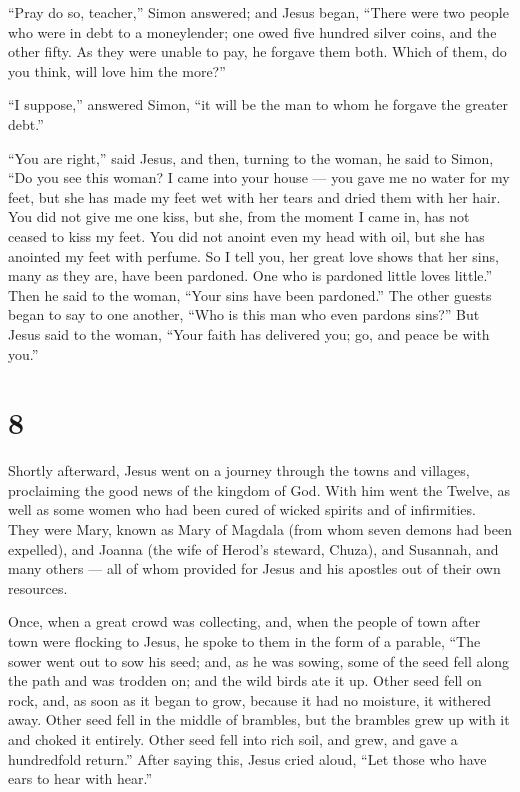 ``Pray do so, teacher,'' Simon answered; and Jesus began, 
``There were two people who were in debt to a moneylender; one owed five
hundred silver coins, and the other fifty.  As they were
unable to pay, he forgave them both. Which of them, do you think, will
love him the more?''

 ``I suppose,'' answered Simon, ``it will be the man to
whom he forgave the greater debt.''

``You are right,'' said Jesus,  and then, turning to the
woman, he said to Simon, ``Do you see this woman? I came into your house
--- you gave me no water for my feet, but she has made my feet wet with
her tears and dried them with her hair.  You did not give
me one kiss, but she, from the moment I came in, has not ceased to kiss
my feet.  You did not anoint even my head with oil, but she
has anointed my feet with perfume.  So I tell you, her
great love shows that her sins, many as they are, have been pardoned.
One who is pardoned little loves little.''  Then he said to
the woman, ``Your sins have been pardoned.''  The other
guests began to say to one another, ``Who is this man who even pardons
sins?''  But Jesus said to the woman, ``Your faith has
delivered you; go, and peace be with you.''

\hypertarget{section-6}{%
\section{8}\label{section-6}}

 Shortly afterward, Jesus went on a journey through the
towns and villages, proclaiming the good news of the kingdom of God.
With him went the Twelve,  as well as some women who had
been cured of wicked spirits and of infirmities. They were Mary, known
as Mary of Magdala (from whom seven demons had been expelled),
 and Joanna (the wife of Herod's steward, Chuza), and
Susannah, and many others --- all of whom provided for Jesus and his
apostles out of their own resources.

 Once, when a great crowd was collecting, and, when the
people of town after town were flocking to Jesus, he spoke to them in
the form of a parable,  ``The sower went out to sow his
seed; and, as he was sowing, some of the seed fell along the path and
was trodden on; and the wild birds ate it up.  Other seed
fell on rock, and, as soon as it began to grow, because it had no
moisture, it withered away.  Other seed fell in the middle
of brambles, but the brambles grew up with it and choked it entirely.
 Other seed fell into rich soil, and grew, and gave a
hundredfold return.'' After saying this, Jesus cried aloud, ``Let those
who have ears to hear with hear.''

